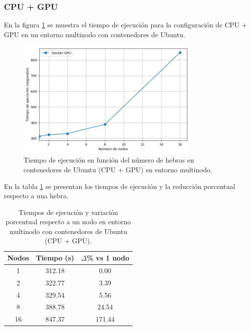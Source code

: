 \subsubsection{CPU + GPU}

En la figura \ref{fig:multi-node_ubuntu_docker_gpu_time} se muestra el tiempo de ejecución para la configuración de CPU + GPU en un entorno multinodo con contenedores de Ubuntu.

\begin{figure}[H]
    \centering
    \includegraphics[width=0.8\textwidth]{imagenes/cap5/multi-node_ubuntu_docker_gpu_time.png}
    \caption{Tiempo de ejecución en función del número de hebras en contenedores de Ubuntu (CPU + GPU) en entorno multinodo.}
    \label{fig:multi-node_ubuntu_docker_gpu_time}
\end{figure}

En la tabla \ref{tab:multi-node_ubuntu_docker_gpu} se presentan los tiempos de ejecución y la reducción porcentual respecto a una hebra.

\begin{table}[ht]
    \centering
    \begin{tabular}{|c|c|c|}
        \hline
        \textbf{Nodos} & \textbf{Tiempo (s)} & \textbf{$\Delta$\% vs 1 nodo} \\
        \hline
        1              & 312.18              & 0.00                          \\
        2              & 322.77              & 3.39                          \\
        4              & 329.54              & 5.56                          \\
        8              & 388.78              & 24.54                         \\
        16             & 847.37              & 171.44                        \\
        \hline
    \end{tabular}
    \caption{Tiempos de ejecución y variación porcentual respecto a un nodo en entorno multinodo con contenedores de Ubuntu (CPU + GPU).}
    \label{tab:multi-node_ubuntu_docker_gpu}
\end{table}

